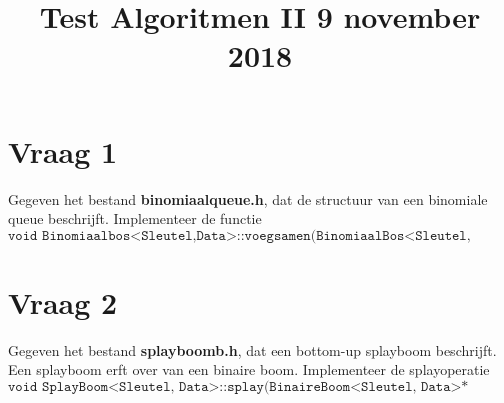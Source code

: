 \documentclass{article}
\begin{document}
\title{Test Algoritmen II 9 november 2018}
\date{}
\author{}
\maketitle

\section{Vraag 1}
    Gegeven het bestand \textbf{binomiaalqueue.h}, dat de structuur van een binomiale queue beschrijft. Implementeer de functie
    $$\texttt{void Binomiaalbos<Sleutel,Data>::voegsamen(BinomiaalBos<Sleutel, Data>\&\& andere)}$$
\section{Vraag 2}
	Gegeven het bestand \textbf{splayboomb.h}, dat een bottom-up splayboom beschrijft. Een splayboom erft over van een binaire boom. Implementeer de splayoperatie
	$$\texttt{void SplayBoom<Sleutel, Data>::splay(BinaireBoom<Sleutel, Data>* plaats)}$$
	
    
\end{document}
